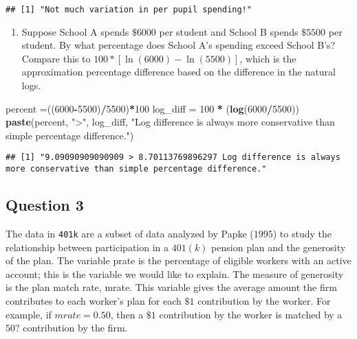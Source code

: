 \documentclass[]{article}
\newenvironment{Shaded}{\begin{snugshade}}{\end{snugshade}}
\newcommand{\KeywordTok}[1]{\textcolor[rgb]{0.13,0.29,0.53}{\textbf{#1}}}
\newcommand{\DecValTok}[1]{\textcolor[rgb]{0.00,0.00,0.81}{#1}}
\newcommand{\StringTok}[1]{\textcolor[rgb]{0.31,0.60,0.02}{#1}}
\newcommand{\OperatorTok}[1]{\textcolor[rgb]{0.81,0.36,0.00}{\textbf{#1}}}
\newcommand{\NormalTok}[1]{#1}
\providecommand{\tightlist}{%
  \setlength{\itemsep}{0pt}\setlength{\parskip}{0pt}}
\begin{document}
\begin{verbatim}
## [1] "Not much variation in per pupil spending!"
\end{verbatim}

\begin{enumerate}
\def\labelenumi{\arabic{enumi}.}
\setcounter{enumi}{6}
\tightlist
\item
  Suppose School A spends \(\$6000\) per student and School B spends
  \(\$5500\) per student. By what percentage does School A's spending
  exceed School B's? Compare this to \(100*[\ln(6000) - \ln(5500)]\),
  which is the approximation percentage difference based on the
  difference in the natural logs.
\end{enumerate}

\begin{Shaded}
\begin{Highlighting}[]
\NormalTok{percent =((}\DecValTok{6000}\OperatorTok{-}\DecValTok{5500}\NormalTok{)}\OperatorTok{/}\DecValTok{5500}\NormalTok{)}\OperatorTok{*}\DecValTok{100}
\NormalTok{log_diff =}\StringTok{ }\DecValTok{100} \OperatorTok{*}\StringTok{ }\NormalTok{(}\KeywordTok{log}\NormalTok{(}\DecValTok{6000}\OperatorTok{/}\DecValTok{5500}\NormalTok{))}
\KeywordTok{paste}\NormalTok{(percent, }\StringTok{">"}\NormalTok{, log_diff, }\StringTok{"Log difference is always more conservative than simple percentage difference."}\NormalTok{)}
\end{Highlighting}
\end{Shaded}

\begin{verbatim}
## [1] "9.09090909090909 > 8.70113769896297 Log difference is always more conservative than simple percentage difference."
\end{verbatim}

\subsection{Question 3}\label{question-3}

The data in \texttt{401k} are a subset of data analyzed by Papke
(\(1995\)) to study the relationship between participation in a
\(401(k)\) pension plan and the generosity of the plan. The variable
prate is the percentage of eligible workers with an active account; this
is the variable we would like to explain. The measure of generosity is
the plan match rate, mrate. This variable gives the average amount the
firm contributes to each worker's plan for each \(\$1\) contribution by
the worker. For example, if \(mrate=0.50\), then a \(\$1\) contribution
by the worker is matched by a \(50?\) contribution by the firm.
\end{document}
